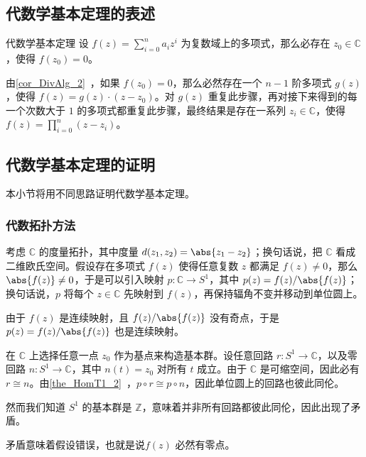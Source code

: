 
\begin{issues}
\issueTODO
\end{issues}


\subsection{代数学基本定理的表述}

\begin{definition}{代数学基本定理}\label{def_BscAlg_1}
设 $f(z)=\sum\limits_{i=0}^n a_iz^i$ 为复数域上的多项式，那么必存在 $z_0\in\mathbb{C}$，使得 $f(z_0)=0$。
\end{definition}

由\autoref{cor_DivAlg_2}~，如果 $f(z_0)=0$，那么必然存在一个 $n-1$ 阶多项式 $g(z)$，使得 $f(z)=g(z)\cdot(z-z_0)$。对 $g(z)$ 重复此步骤，再对接下来得到的每一个次数大于 $1$ 的多项式都重复此步骤，最终结果是存在一系列 $z_i\in\mathbb{C}$，使得 $f(z)=\prod\limits_{i=0}^{n}(z-z_i)$。

\subsection{代数学基本定理的证明}

本小节将用不同思路证明代数学基本定理。

\subsubsection{代数拓扑方法}

考虑 $\mathbb{C}$ 的度量拓扑，其中度量 $d(z_1, z_2)=\abs{z_1-z_2}$；换句话说，把 $\mathbb{C}$ 看成二维欧氏空间。假设存在多项式 $f(z)$ 使得任意复数 $z$ 都满足 $f(z)\not=0$，那么 $\abs{f(z)}\not=0$，于是可以引入映射 $p:\mathbb{C}\rightarrow S^1$，其中 $p(z)=f(z)/\abs{f(z)}$；换句话说，$p$ 将每个 $z\in\mathbb{C}$ 先映射到 $f(z)$，再保持辐角不变并移动到单位圆上。

由于 $f(z)$ 是连续映射，且 $f(z)/\abs{f(z)}$ 没有奇点，于是 $p(z)=f(z)/\abs{f(z)}$ 也是连续映射。

在 $\mathbb{C}$ 上选择任意一点 $z_0$ 作为基点来构造基本群。设任意回路 $r:S^1\rightarrow\mathbb{C}$，以及零回路 $n:S^1\rightarrow\mathbb{C}$，其中 $n(t)=z_0$ 对所有 $t$ 成立。由于 $\mathbb{C}$ 是可缩空间，因此必有 $r\cong n$。由\autoref{the_HomT1_2}~，$p\circ r\cong p\circ n$，因此单位圆上的回路也彼此同伦。

然而我们知道 $S^1$ 的基本群是 $\mathbb{Z}$，意味着并非所有回路都彼此同伦，因此出现了矛盾。

矛盾意味着假设错误，也就是说$f(z)$ 必然有零点。


